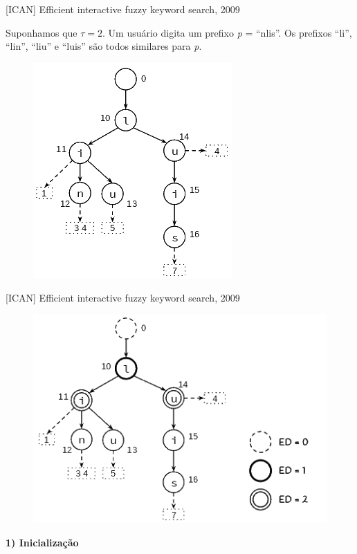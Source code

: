\documentclass[11pt]{beamer}
\begin{document}
\begin{frame}{[ICAN] Efficient interactive fuzzy keyword search, 2009}

    \small
    Suponhamos que $\tau = 2$. Um usuário digita um prefixo \textit{p} = ``nlis''. Os prefixos ``li'', ``lin'', ``liu'' e ``luis'' são todos similares para \textit{p}. \pause

    \begin{figure}
      \includegraphics[scale=0.50]{pictures/ican_1.png}
      \centering
    \end{figure}
    
\end{frame}

\begin{frame}{[ICAN] Efficient interactive fuzzy keyword search, 2009}
    
    \begin{figure}
      \includegraphics[scale=0.45]{pictures/ican_2.png}
      \centering
    \end{figure}
    
    \textbf{1) Inicialização}
    
\end{frame}
\end{document}
